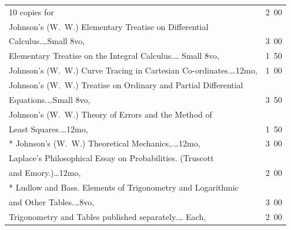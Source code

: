 \documentclass[a4paper,12pt]{book}[2004/02/16]
\theoremstyle{ilemma}
\theoremstyle{itheorem}
\theoremstyle{iother}
\theoremstyle{icorollary}
\theoremstyle{numcorollary}
\theoremstyle{idefinition}
\begin{document}
\begin{longtable}{@{}l@{ }r@{}}
\nopagebreak

 \hfill 10 copies for &2\ 00\\

Johnson's (W.~W.) Elementary Treatise on Differential\\

\nopagebreak

\indent\indent Calculus.\dotfill\ldots Small 8vo, &3\ 00\\

\nopagebreak

\indent Elementary Treatise on the Integral Calculus.\dotfill\ldots
Small 8vo, &1\ 50\\

Johnson's (W.~W.) Curve Tracing in Cartesian
Co-ordinates.\dotfill\ldots 12mo, &1\ 00\\

Johnson's (W.~W.) Treatise on Ordinary and Partial Differential\\

\nopagebreak

\indent\indent Equations.\dotfill\ldots Small 8vo, &3\ 50\\

Johnson's (W.~W.) Theory of Errors and the Method of\\

\nopagebreak

\indent\indent Least Squares.\dotfill\ldots 12mo, &1\ 50\\

* Johnson's (W.~W.) Theoretical Mechanics,.\dotfill\ldots 12mo, &3\ 00\\

Laplace's Philosophical Essay on Probabilities. (Truscott\\

\nopagebreak

\indent\indent and Emory.)\dotfill\ldots 12mo, &2\ 00\\

* Ludlow and Bass. Elements of Trigonometry and Logarithmic\\

\nopagebreak

\indent\indent and Other Tables.\dotfill\ldots 8vo, &3\ 00\\

\nopagebreak

\indent Trigonometry and Tables published separately.\dotfill\ldots
Each, &2\ 00\\


\end{longtable}
\end{document}
